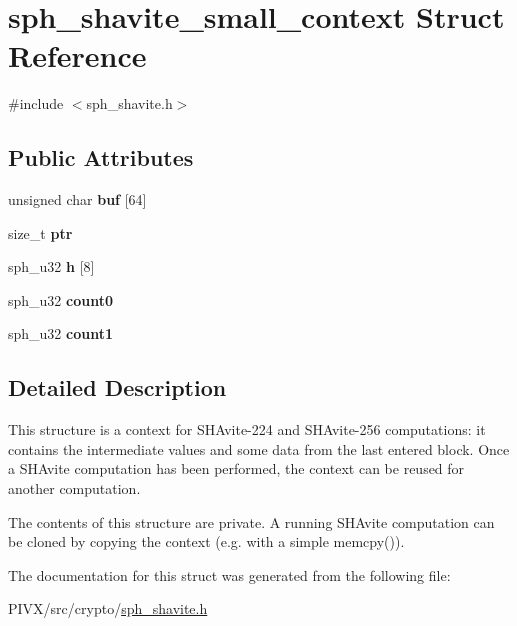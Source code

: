 \hypertarget{structsph__shavite__small__context}{}\section{sph\+\_\+shavite\+\_\+small\+\_\+context Struct Reference}
\label{structsph__shavite__small__context}


{\ttfamily \#include $<$sph\+\_\+shavite.\+h$>$}

\subsection*{Public Attributes}
\begin{DoxyCompactItemize}
\item 
\mbox{\label{structsph__shavite__small__context_ad74589c94e8c2dcb7a5aafdf0ca12d6b}} 
unsigned char {\bfseries buf} \mbox{[}64\mbox{]}
\item 
\mbox{\label{structsph__shavite__small__context_a6fce4cf25f61aa424d73d5eea7655f7f}} 
size\+\_\+t {\bfseries ptr}
\item 
\mbox{\label{structsph__shavite__small__context_a178c52fd8f4723c152891928cdf9428f}} 
sph\+\_\+u32 {\bfseries h} \mbox{[}8\mbox{]}
\item 
\mbox{\label{structsph__shavite__small__context_a61e5866a6d05a94f093df7bb0ba7e719}} 
sph\+\_\+u32 {\bfseries count0}
\item 
\mbox{\label{structsph__shavite__small__context_a19e4d2f46dcf6ac31d8cbde7f7aceeea}} 
sph\+\_\+u32 {\bfseries count1}
\end{DoxyCompactItemize}


\subsection{Detailed Description}
This structure is a context for S\+H\+Avite-\/224 and S\+H\+Avite-\/256 computations\+: it contains the intermediate values and some data from the last entered block. Once a S\+H\+Avite computation has been performed, the context can be reused for another computation.

The contents of this structure are private. A running S\+H\+Avite computation can be cloned by copying the context (e.\+g. with a simple {\ttfamily memcpy()}). 

The documentation for this struct was generated from the following file\+:\begin{DoxyCompactItemize}
\item 
P\+I\+V\+X/src/crypto/\mbox{\hyperlink{sph__shavite_8h}{sph\+\_\+shavite.\+h}}\end{DoxyCompactItemize}
